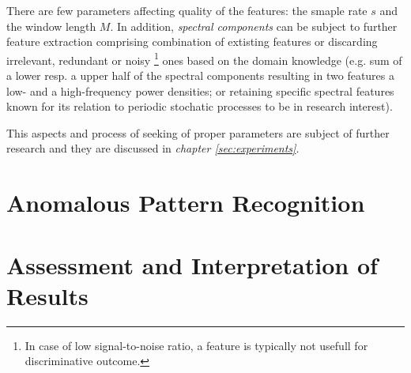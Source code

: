 There are few parameters affecting quality of the  features: %
the smaple rate $s$ and the window length $M$. 
In addition, \emph{spectral components} can be subject to further feature extraction 
comprising combination of extisting features or discarding irrelevant, 
redundant  or noisy%
\footnote{In case of low signal-to-noise ratio, a feature is typically not usefull 
for discriminative outcome.}%
ones based on the domain knowledge (e.g. sum of a lower resp. a upper half of the 
spectral components resulting in two features a low- and a high-frequency power densities;
or retaining specific spectral features known for its relation to 
periodic stochatic processes to be in research interest).

This aspects and process of seeking of proper parameters are subject of further 
research and they are discussed in \emph{chapter \ref{sec:experiments}}.

\section{Anomalous Pattern Recognition}

\section{Assessment and Interpretation of Results}
